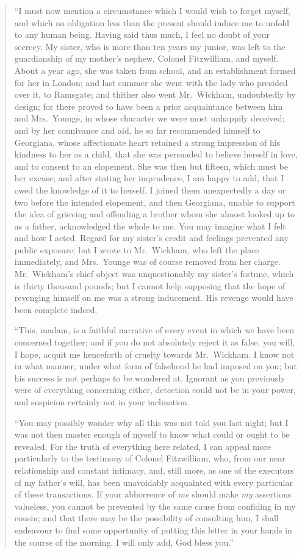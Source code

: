 \documentclass[12pt,english]{book}
\begin{document}
\begin{quotation}
{}``I must now mention a circumstance which I would wish to forget
myself, and which no obligation less than the present should induce
me to unfold to any human being. Having said thus much, I feel no
doubt of your secrecy. My sister, who is more than ten years my junior,
was left to the guardianship of my mother's nephew, Colonel Fitzwilliam,
and myself. About a year ago, she was taken from school, and an establishment
formed for her in London; and last summer she went with the lady who
presided over it, to Ramsgate; and thither also went Mr.\ Wickham,
undoubtedly by design; for there proved to have been a prior acquaintance
between him and Mrs.\ Younge, in whose character we were most unhappily
deceived; and by her connivance and aid, he so far recommended himself
to Georgiana, whose affectionate heart retained a strong impression
of his kindness to her as a child, that she was persuaded to believe
herself in love, and to consent to an elopement. She was then but
fifteen, which must be her excuse; and after stating her imprudence,
I am happy to add, that I owed the knowledge of it to herself. I joined
them unexpectedly a day or two before the intended elopement, and
then Georgiana, unable to support the idea of grieving and offending
a brother whom she almost looked up to as a father, acknowledged the
whole to me. You may imagine what I felt and how I acted. Regard for
my sister's credit and feelings prevented any public exposure; but
I wrote to Mr.\ Wickham, who left the place immediately, and Mrs.\ Younge
was of course removed from her charge. Mr.\ Wickham's chief object
was unquestionably my sister's fortune, which is thirty thousand pounds;
but I cannot help supposing that the hope of revenging himself on
me was a strong inducement. His revenge would have been complete indeed.

{}``This, madam, is a faithful narrative of every event in which
we have been concerned together; and if you do not absolutely reject
it as false, you will, I hope, acquit me henceforth of cruelty towards
Mr.\ Wickham. I know not in what manner, under what form of falsehood
he had imposed on you; but his success is not perhaps to be wondered
at. Ignorant as you previously were of everything concerning either,
detection could not be in your power, and suspicion certainly not
in your inclination.

{}``You may possibly wonder why all this was not told you last night;
but I was not then master enough of myself to know what could or ought
to be revealed. For the truth of everything here related, I can appeal
more particularly to the testimony of Colonel Fitzwilliam, who, from
our near relationship and constant intimacy, and, still more, as one
of the executors of my father's will, has been unavoidably acquainted
with every particular of these transactions. If your abhorrence of
\textit{me} should make \textit{my} assertions valueless, you cannot
be prevented by the same cause from confiding in my cousin; and that
there may be the possibility of consulting him, I shall endeavour
to find some opportunity of putting this letter in your hands in the
course of the morning. I will only add, God bless you.''


\end{quotation}
\end{document}
